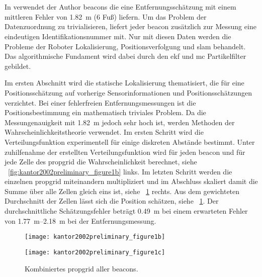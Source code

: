 \section{}

In \cite{kantor2002preliminary} verwendet der Author \Glspl{beacon} die eine Entfernungsschätzung mit einem mittleren Fehler von \SI{1.82}{\metre} (6 Fuß) liefern. Um das Problem der Datenzuordnung zu trivialisieren, liefert jeder \Gls{beacon} zusätzlich zur Messung eine eindeutigen Identifikationsnummer mit. Nur mit diesen Daten werden die Probleme der Roboter Lokalisierung, Positionsverfolgung und \Gls{slam} behandelt. Das algorithmische Fundament wird dabei durch den \Gls{ekf} und \Gls{mc} Partikelfilter gebildet.

Im ersten Abschnitt wird die statische Lokalisierung thematisiert, die für eine Positionsschätzung auf vorherige Sensorinformationen und Positionsschätzungen verzichtet. Bei einer fehlerfreien Entfernungsmessungen ist die Positionsbestimmung ein mathematisch triviales Problem. Da die Messungenauigkeit mit \SI{1.82}{\metre} jedoch sehr hoch ist, werden Methoden der Wahrscheinlichkeitstheorie verwendet. Im ersten Schritt wird die Verteilungsfunktion experimentell für einige diskreten Abstände bestimmt. Unter zuhilfenahme der erstellten Verteilungsfunktion wird für jeden \Gls{beacon} und für jede Zelle des \Gls{propgrid} die Wahrscheinlichkeit berechnet, siehe \figurename~\ref{fig:kantor2002preliminary_figure1b} links. Im letzten Schritt werden die einzelnen \Gls{propgrid} miteinandern multipliziert und im Abschluss skaliert damit die Summe über alle Zellen gleich eins ist, siehe \figurename~\ref{fig:kantor2002preliminary_figure1c} rechts. Aus dem gewichteten Durchschnitt der Zellen lässt sich die Position schätzen, siehe \figurename~\ref{fig:kantor2002preliminary_figure1c}. Der durchschnittliche Schätzungsfehler beträgt \SI{0.49}{\metre} bei einem erwarteten Fehler von \SIrange{1,77}{2,18}{\metre} bei der Entfernungsmessung.

\begin{figure}[htbp]
  \begin{minipage}[t]{0.45\linewidth}
    \centering
    \texttt{[image: kantor2002preliminary\_figure1b]}
    \caption{Links: \Gls{propgrid} pro \Gls{beacon}. Rechts: Kombination zweier \Glspl{propgrid}.}
    \label{fig:kantor2002preliminary_figure1b}
  \end{minipage}
  \hfill
  \begin{minipage}[t]{0.45\linewidth}
    \centering
    \texttt{[image: kantor2002preliminary\_figure1c]}
    \caption{Kombiniertes \Gls{propgrid} aller \Glspl{beacon}.}
    \label{fig:kantor2002preliminary_figure1c}
  \end{minipage}
\end{figure}


